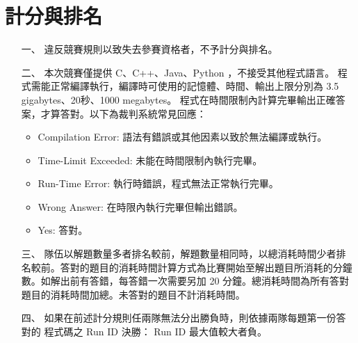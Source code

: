 \section*{計分與排名}
\begin{enumerate}
\item[一、]違反競賽規則以致失去參賽資格者，不予計分與排名。
\item[二、]本次競賽僅提供 C、C++、Java、Python ，不接受其他程式語言。
程式需能正常編譯執行，編譯時可使用的記憶體、時間、輸出上限分別為
3.5 gigabytes、20秒、1000 megabytes。
程式在時間限制內計算完畢輸出正確答案，才算答對。以下為裁判系統常見回應：
{	\setlength{\parskip}{1pt}
	\begin{itemize}
    \item Compilation Error: 語法有錯誤或其他因素以致於無法編譯或執行。
    \item Time-Limit Exceeded: 未能在時間限制內執行完畢。
    \item Run-Time Error: 執行時錯誤，程式無法正常執行完畢。
    \item Wrong Answer: 在時限內執行完畢但輸出錯誤。
    \item Yes: 答對。
    \end{itemize}
}
\item[三、]隊伍以解題數量多者排名較前，解題數量相同時，以總消耗時間少者排名較前。答對的題目的消耗時間計算方式為比賽開始至解出題目所消耗的分鐘數。如解出前有答錯，每答錯一次需要另加 20 分鐘。總消耗時間為所有答對題目的消耗時間加總。未答對的題目不計消耗時間。
\item[四、]如果在前述計分規則任兩隊無法分出勝負時，則依據兩隊每題第一份答對的
程式碼之 Run ID 決勝： Run ID 最大值較大者負。
\end{enumerate}

\newpage
